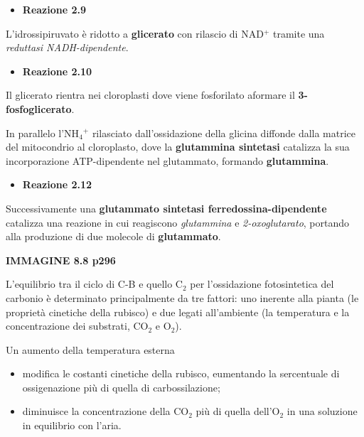 \documentclass[]{article}
\begin{document}
\begin{itemize}
\itemsep1pt\parskip0pt
\item
  \textbf{Reazione 2.9}
\end{itemize}

L'idrossipiruvato è ridotto a \textbf{glicerato} con rilascio di NAD$^+$
tramite una \emph{reduttasi NADH-dipendente}.

\begin{itemize}
\itemsep1pt\parskip0pt
\item
  \textbf{Reazione 2.10}
\end{itemize}

Il glicerato rientra nei cloroplasti dove viene fosforilato aformare il
\textbf{3-fosfoglicerato}.

In parallelo l'NH$_4$$^+$ rilasciato dall'ossidazione della glicina
diffonde dalla matrice del mitocondrio al cloroplasto, dove la
\textbf{glutammina sintetasi} catalizza la sua incorporazione
ATP-dipendente nel glutammato, formando \textbf{glutammina}.

\begin{itemize}
\itemsep1pt\parskip0pt
\item
  \textbf{Reazione 2.12}
\end{itemize}

Successivamente una \textbf{glutammato sintetasi
ferredossina-dipendente} catalizza una reazione in cui reagiscono
\emph{glutammina} e \emph{2-oxoglutarato}, portando alla produzione di
due molecole di \textbf{glutammato}.

\textbf{IMMAGINE 8.8 p296}

L'equilibrio tra il ciclo di C-B e quello C$_2$ per l'ossidazione
fotosintetica del carbonio è determinato principalmente da tre fattori:
uno inerente alla pianta (le proprietà cinetiche della rubisco) e due
legati all'ambiente (la temperatura e la concentrazione dei substrati,
CO$_2$ e O$_2$).

Un aumento della temperatura esterna

\begin{itemize}
\itemsep1pt\parskip0pt
\item
  modifica le costanti cinetiche della rubisco, eumentando la
  sercentuale di ossigenazione più di quella di carbossilazione;
\item
  diminuisce la concentrazione della CO$_2$ più di quella dell'O$_2$ in
  una soluzione in equilibrio con l'aria.
\end{itemize}
\end{document}
